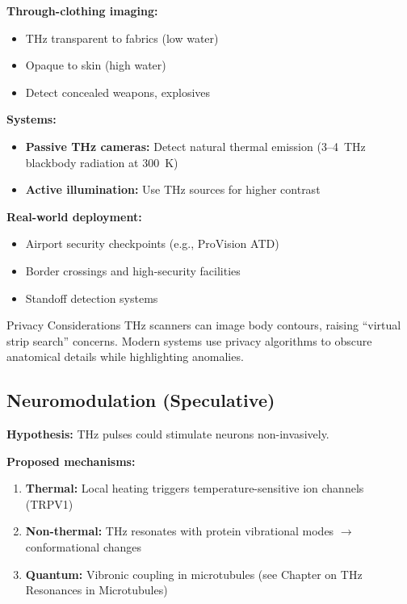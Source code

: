 \textbf{Through-clothing imaging:}
\begin{itemize}
\item THz transparent to fabrics (low water)
\item Opaque to skin (high water)
\item Detect concealed weapons, explosives
\end{itemize}

\textbf{Systems:}
\begin{itemize}
\item \textbf{Passive THz cameras:} Detect natural thermal emission (3--4~THz blackbody radiation at 300~K)
\item \textbf{Active illumination:} Use THz sources for higher contrast
\end{itemize}

\textbf{Real-world deployment:}
\begin{itemize}
\item Airport security checkpoints (e.g., ProVision ATD)
\item Border crossings and high-security facilities
\item Standoff detection systems
\end{itemize}

\begin{calloutbox}{Privacy Considerations}
THz scanners can image body contours, raising ``virtual strip search'' concerns. Modern systems use privacy algorithms to obscure anatomical details while highlighting anomalies.
\end{calloutbox}

\subsection{Neuromodulation (Speculative)}
\label{subsec:neuromodulation}

\textbf{Hypothesis:} THz pulses could stimulate neurons non-invasively.

\textbf{Proposed mechanisms:}
\begin{enumerate}
\item \textbf{Thermal:} Local heating triggers temperature-sensitive ion channels (TRPV1)
\item \textbf{Non-thermal:} THz resonates with protein vibrational modes $\rightarrow$ conformational changes
\item \textbf{Quantum:} Vibronic coupling in microtubules (see Chapter on THz Resonances in Microtubules)
\end{enumerate}

